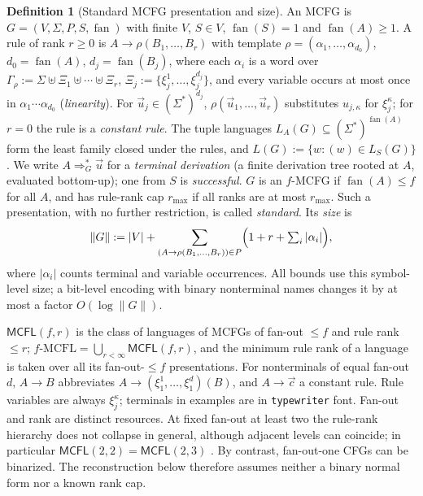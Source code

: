 \documentclass[11pt]{article}
\numberwithin{equation}{section}
\theoremstyle{plain}
\theoremstyle{definition}
\newtheorem{definition}[theorem]{Definition}
\theoremstyle{remark}
\newcommand{\tuple}[1]{\vec{#1}}
\newcommand{\fan}{\operatorname{fan}}
\begin{document}
\begin{definition}[Standard MCFG presentation and size]
\label{def:standard-mcfg}
An MCFG \cite{SekiEtAl1991,Kallmeyer2010} is
$G=(V,\Sigma,P,S,\fan)$ with finite $V$, $S\in V$, $\fan(S)=1$ and
$\fan(A)\ge1$.  A rule of rank $r\ge0$ is
$A\to\rho(B_1,\ldots,B_r)$ with template
$\rho=(\alpha_1,\ldots,\alpha_{d_0})$, $d_0=\fan(A)$, $d_j=\fan(B_j)$, where
each $\alpha_i$ is a word over
$\Gamma_\rho:=\Sigma\uplus\Xi_1\uplus\cdots\uplus\Xi_r$,
$\Xi_j:=\{\xi_j^1,\ldots,\xi_j^{d_j}\}$, and every variable occurs at most once
in $\alpha_1\cdots\alpha_{d_0}$ (\emph{linearity}).  For $\tuple u_j\in(\Sigma^*)^{d_j}$,
$\rho(\tuple u_1,\ldots,\tuple u_r)$ substitutes $u_{j,\kappa}$ for
$\xi_j^\kappa$; for $r=0$ the rule is a \emph{constant rule}.  The tuple
languages $L_A(G)\subseteq(\Sigma^*)^{\fan(A)}$ form the least family closed
under the rules, and $L(G):=\{w:(w)\in L_S(G)\}$.  We write
$A\Rightarrow_G^*\tuple u$ for a \emph{terminal derivation} (a finite derivation
tree rooted at $A$, evaluated bottom-up); one from $S$ is \emph{successful}.
$G$ is an $f$-MCFG if $\fan(A)\le f$ for all $A$, and has rule-rank cap
$r_{\max}$ if all ranks are at most $r_{\max}$.  Such a presentation, with no
further restriction, is called \emph{standard}.  Its \emph{size} is
\[
 \|G\|:=|V|+\sum_{(A\to\rho(B_1,\ldots,B_r))\in P}
 \Bigl(1+r+\textstyle\sum_{i}|\alpha_i|\Bigr),
\]
where $|\alpha_i|$ counts terminal and variable occurrences.  All
bounds use this symbol-level size; a bit-level encoding with binary
nonterminal names changes it by at most a factor $O(\log\|G\|)$.
\end{definition}

$\mathsf{MCFL}(f,r)$ is the class of languages of MCFGs of fan-out $\le f$ and
rule rank $\le r$; $f\text{-}\mathrm{MCFL}=\bigcup_{r<\infty}\mathsf{MCFL}(f,r)$,
and the minimum rule rank of a language is taken over all its fan-out-$\le f$
presentations.  For nonterminals of equal fan-out $d$, $A\to B$ abbreviates
$A\to(\xi_1^1,\ldots,\xi_1^d)(B)$, and $A\to\tuple c$ a constant rule.  Rule
variables are always $\xi_j^\kappa$; terminals in examples are in
\texttt{typewriter} font.  Fan-out and rank are distinct resources.  At fixed fan-out at least
two the rule-rank hierarchy does not collapse in general, although adjacent
levels can coincide; in particular
$\mathsf{MCFL}(2,2)=\mathsf{MCFL}(2,3)$
\cite{RambowSatta1999,GomezRodriguezEtAl2009}.  By contrast, fan-out-one
CFGs can be binarized.  The reconstruction below therefore assumes neither
a binary normal form nor a known rank cap.
\end{document}
